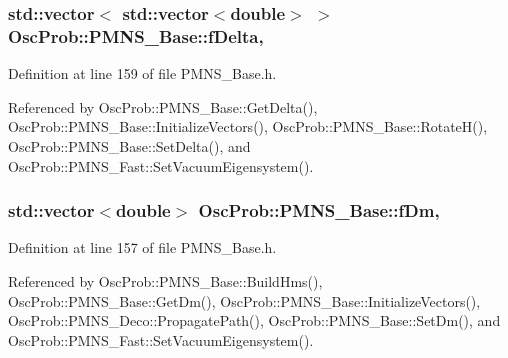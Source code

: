 \subsubsection[{\texorpdfstring{f\+Delta}{fDelta}}]{\setlength{\rightskip}{0pt plus 5cm}std\+::vector$<$ std\+::vector$<$double$>$ $>$ Osc\+Prob\+::\+P\+M\+N\+S\+\_\+\+Base\+::f\+Delta\hspace{0.3cm}{\ttfamily [protected]}, {\ttfamily [inherited]}}\hypertarget{classOscProb_1_1PMNS__Base_ab2a5fa40e689b221c8a7d2c17213810d}{}\label{classOscProb_1_1PMNS__Base_ab2a5fa40e689b221c8a7d2c17213810d}


Definition at line 159 of file P\+M\+N\+S\+\_\+\+Base.\+h.



Referenced by Osc\+Prob\+::\+P\+M\+N\+S\+\_\+\+Base\+::\+Get\+Delta(), Osc\+Prob\+::\+P\+M\+N\+S\+\_\+\+Base\+::\+Initialize\+Vectors(), Osc\+Prob\+::\+P\+M\+N\+S\+\_\+\+Base\+::\+Rotate\+H(), Osc\+Prob\+::\+P\+M\+N\+S\+\_\+\+Base\+::\+Set\+Delta(), and Osc\+Prob\+::\+P\+M\+N\+S\+\_\+\+Fast\+::\+Set\+Vacuum\+Eigensystem().

\subsubsection[{\texorpdfstring{f\+Dm}{fDm}}]{\setlength{\rightskip}{0pt plus 5cm}std\+::vector$<$double$>$ Osc\+Prob\+::\+P\+M\+N\+S\+\_\+\+Base\+::f\+Dm\hspace{0.3cm}{\ttfamily [protected]}, {\ttfamily [inherited]}}\hypertarget{classOscProb_1_1PMNS__Base_a406a31c3b5d620e5a0cace5b411f9f70}{}\label{classOscProb_1_1PMNS__Base_a406a31c3b5d620e5a0cace5b411f9f70}


Definition at line 157 of file P\+M\+N\+S\+\_\+\+Base.\+h.



Referenced by Osc\+Prob\+::\+P\+M\+N\+S\+\_\+\+Base\+::\+Build\+Hms(), Osc\+Prob\+::\+P\+M\+N\+S\+\_\+\+Base\+::\+Get\+Dm(), Osc\+Prob\+::\+P\+M\+N\+S\+\_\+\+Base\+::\+Initialize\+Vectors(), Osc\+Prob\+::\+P\+M\+N\+S\+\_\+\+Deco\+::\+Propagate\+Path(), Osc\+Prob\+::\+P\+M\+N\+S\+\_\+\+Base\+::\+Set\+Dm(), and Osc\+Prob\+::\+P\+M\+N\+S\+\_\+\+Fast\+::\+Set\+Vacuum\+Eigensystem().

